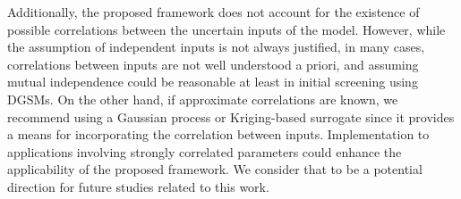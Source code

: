 Additionally, the proposed framework does not
account for the existence of possible correlations between the uncertain
inputs of the model. However, while the assumption of independent
inputs is not always justified, in many cases, correlations between
inputs are not well understood a priori, and assuming mutual independence
could be reasonable at least in initial screening using DGSMs. On the other
hand, if approximate correlations are known, we recommend using a Gaussian 
process or Kriging-based surrogate since it 
provides a means for incorporating the correlation between inputs.  
Implementation to applications involving strongly correlated parameters
could enhance the applicability of the proposed framework. 
We consider that to be a potential direction for future studies related
to this work. 
















